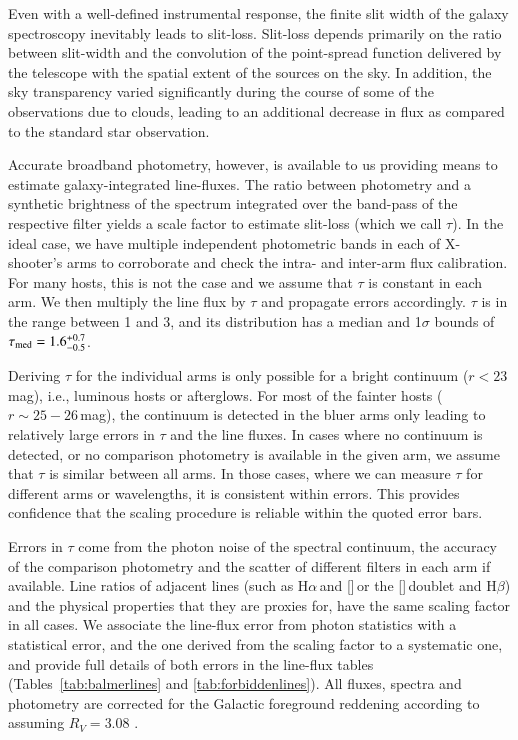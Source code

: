 \documentclass[traditabstract, longauth]{aa}
\newcommand{\hb}{H$\beta$}
\newcommand{\ha}{H$\alpha$}
\newcommand{\oiii}{[\ion{O}{iii}]}
\newcommand{\nii}{[\ion{N}{ii}]}
\begin{document}
Even with a well-defined instrumental response, the finite slit width of the galaxy spectroscopy inevitably leads to slit-loss. Slit-loss depends primarily on the ratio between slit-width and the convolution of the point-spread function delivered by the telescope with the spatial extent of the sources on the sky. In addition, the sky transparency varied significantly during the course of some of the observations due to clouds, leading to an additional decrease in flux as compared to the standard star observation.

Accurate broadband photometry, however, is available to us providing means to estimate galaxy-integrated line-fluxes. The ratio between photometry and a synthetic brightness of the spectrum integrated over the band-pass of the respective filter yields a scale factor to estimate slit-loss (which we call $\tau$). In the ideal case, we have multiple independent photometric bands in each of X-shooter's arms to corroborate and check the intra- and inter-arm flux calibration. For many hosts, this is not the case and we assume that $\tau$ is constant in each arm. We then multiply the line flux by $\tau$ and propagate errors accordingly. $\tau$ is in the range between 1 and 3, and its distribution has a median and 1$\sigma$ bounds of $\tau_{\rm {med}} = 1.6_{-0.5}^{+0.7}$. 

Deriving $\tau$ for the individual arms is only possible for a bright continuum ($r<23$\,mag), i.e., luminous hosts or afterglows. For most of the fainter hosts ($r\sim25-26$\,mag), the continuum is detected in the bluer arms only leading to relatively large errors in $\tau$ and the line fluxes. In cases where no continuum is detected, or no comparison photometry is available in the given arm, we assume that $\tau$ is similar between all arms. In those cases, where we can measure $\tau$ for different arms or wavelengths, it is consistent within errors. This provides confidence that the scaling procedure is reliable within the quoted error bars.

Errors in $\tau$ come from the photon noise of the spectral continuum, the accuracy of the comparison photometry and the scatter of different filters in each arm if available. Line ratios of adjacent lines (such as \ha\,and \nii\,or the \oiii\,doublet and \hb) and the physical properties that they are proxies for, have the same scaling factor in all cases. We associate the line-flux error from photon statistics with a statistical error, and the one derived from the scaling factor to a systematic one, and provide full details of both errors in the line-flux tables (Tables~\ref{tab:balmerlines} and \ref{tab:forbiddenlines}). All fluxes, spectra and photometry are corrected for the Galactic foreground reddening according to \citet{2011ApJ...737..103S} assuming $R_V=3.08$ \citep{1992ApJ...395..130P}.
\end{document}
